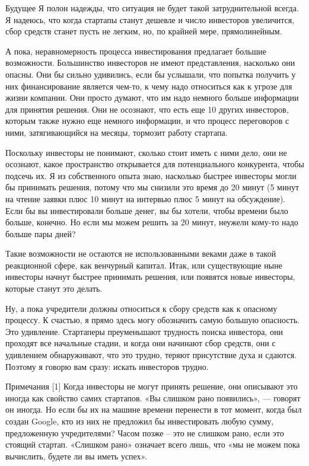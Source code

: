 \documentclass[ebook,12pt,oneside,openany]{memoir}
\begin{document}
Будущее Я полон надежды, что ситуация не будет такой затруднительной
всегда. Я надеюсь, что когда стартапы станут дешевле и число
инвесторов увеличится, сбор средств станет пусть не легким, но, по
крайней мере, прямолинейным.

А пока, неравномерность процесса инвестирования предлагает большие
возможности. Большинство инвесторов не имеют представления, насколько
они опасны. Они бы сильно удивились, если бы услышали, что попытка
получить у них финансирование является чем-то, к чему надо относиться
как к угрозе для жизни компании. Они просто думают, что им надо
немного больше информации для принятия решения. Они не осознают, что
есть еще 10 других инвесторов, которым также нужно еще немного
информации, и что процесс переговоров с ними, затягивающийся на
месяцы, тормозит работу стартапа.

Поскольку инвесторы не понимают, сколько стоит иметь с ними дело, они
не осознают, какое пространство открывается для потенциального
конкурента, чтобы подсечь их. Я из собственного опыта знаю, насколько
быстрее инвесторы могли бы принимать решения, потому что мы снизили
это время до 20 минут (5 минут на чтение заявки плюс 10 минут на
интервью плюс 5 минут на обсуждение). Если бы вы инвестировали больше
денег, вы бы хотели, чтобы времени было больше, конечно. Но если мы
можем решить за 20 минут, неужели кому-то надо больше пары дней?

Такие возможности не остаются не использованными веками даже в такой
реакционной сфере, как венчурный капитал. Итак, или существующие ныне
инвесторы начнут быстрее принимать решения, или появятся новые
инвесторы, которые станут это делать.

Ну, а пока учредители должны относиться к сбору средств как к опасному
процессу. К счастью, я прямо здесь могу обозначить самую большую
опасность. Это удивление. Стартаперы преуменьшают трудность поиска
инвестора, они проходят все начальные стадии, и когда они начинают
сбор средств, они с удивлением обнаруживают, что это трудно, теряют
присутствие духа и сдаются. Поэтому я говорю вам сразу: искать
инвесторов трудно.

Примечания [1] Когда инвесторы не могут принять решение, они описывают
это иногда как свойство самих стартапов. «Вы слишком рано появились»,
— говорят он иногда. Но если бы их на машине времени перенести в тот
момент, когда был создан Google, кто из них не предложил бы
инвестировать любую сумму, предложенную учредителями? Часом позже –
это не слишком рано, если это стоящий стартап. «Слишком рано» означает
всего лишь, что «мы не можем пока вычислить, будете ли вы иметь
успех».
\end{document}

